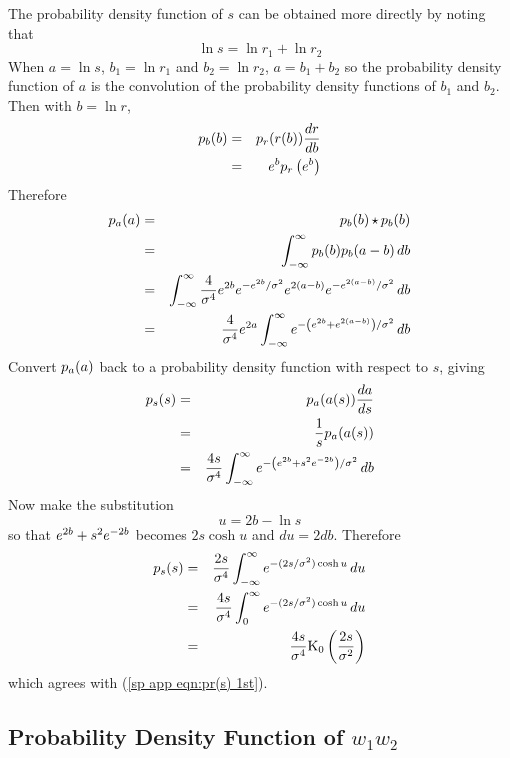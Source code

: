 The probability density function of $s$ can be obtained more directly by noting that 
\begin{equation}
\ln s = \ln r_1+\ln r_2
\end{equation}
When $a=\ln s$, $b_1=\ln r_1$ and $b_2=\ln r_2$, $a=b_1+b_2$ so the probability density function
of $a$ is the convolution of the probability density functions of $b_1$ and $b_2$.  Then with 
$b=\ln r$,
\begin{eqnarray}
{p}_b(b)&=&{p}_r(r(b))\frac{dr}{db}{\nonumber}\\
&=&e^b{p}_r\left(e^b\right)
\end{eqnarray}
Therefore
\begin{eqnarray}
{p}_a(a)&=&{p}_b(b){\,\star\,}{p}_b(b){\nonumber}\\
&=&\int_{-\infty}^{\infty} {p}_b(b){p}_b(a-b)\,db{\nonumber}\\
&=&\int_{-\infty}^{\infty} \frac{4}{{\sigma^{4}}}
{e^{2b}}{e^{-{e^{2b}}/{\sigma^2}}}{e^{2(a-b)}}{e^{-{e^{2(a-b)}}/{\sigma^2}}}\,db{\nonumber}\\
&=&\frac{4}{{\sigma^{4}}}{e^{2a}}\int_{-\infty}^{\infty}
{e^{-\left({e^{2b}}+{e^{2(a-b)}}\right)/{\sigma^2}}}\,db
\end{eqnarray}
Convert ${p}_a(a)$ back to a probability density function with respect to $s$, giving
\begin{eqnarray}
{p}_s(s)&=&{p}_a(a(s))\frac{da}{ds}{\nonumber}\\
&=&\frac{1}{s}{p}_a(a(s)){\nonumber}\\
&=&\frac{4s}{{\sigma^{4}}}\int_{-\infty}^{\infty}
{e^{-\left({e^{2b}}+s^2{e^{-2b}}\right)/{\sigma^2}}}\,db
\end{eqnarray}
Now make the substitution
\begin{equation}
u=2b-\ln s
\end{equation}
so that ${e^{2b}}+s^2{e^{-2b}}$ becomes $2s\cosh u$ and $du=2db$.
Therefore
\begin{eqnarray}
{p}_s(s)&=&\frac{2s}{{\sigma^{4}}}\int_{-\infty}^{\infty}
{e^{-(2s/{\sigma^2})\cosh u}}\,du{\nonumber}\\
&=&\frac{4s}{{\sigma^{4}}}\int_0^{\infty}{e^{-(2s/{\sigma^2})\cosh u}}\,du{\nonumber}\\
&=&\frac{4s}{{\sigma^{4}}}{\mathop{\rm K_0}\nolimits\left(\frac{2s}{{\sigma^2}}\right)}\label{sp app eqn:pr(s)}
\end{eqnarray}
which agrees with (\ref{sp app eqn:pr(s) 1st}).


\subsection{Probability Density Function of $w_1w_2$}

